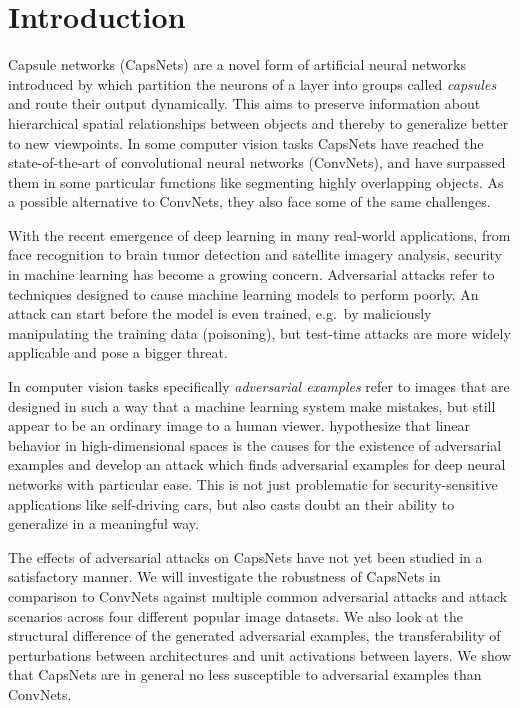 \section{Introduction}
\label{sec:introduction}

Capsule networks (CapsNets) are a novel form of artificial neural networks introduced by \citet{capsules,em} which partition the neurons of a layer into groups called \emph{capsules} and route their output dynamically.
This aims to preserve information about hierarchical spatial relationships between objects and thereby to generalize better to new viewpoints.
In some computer vision tasks CapsNets have reached the state-of-the-art of convolutional neural networks (ConvNets), and have surpassed them in some particular functions like segmenting highly overlapping objects.
As a possible alternative to ConvNets, they also face some of the same challenges.

With the recent emergence of deep learning in many real-world applications, from face recognition to brain tumor detection and satellite imagery analysis, security in machine learning has become a growing concern.
Adversarial attacks refer to techniques designed to cause machine learning models to perform poorly.
An attack can start before the model is even trained, e.g.\ by maliciously manipulating the training data (poisoning), but test-time attacks are more widely applicable and pose a bigger threat.

In computer vision tasks specifically \emph{adversarial examples} \citep{intriguing} refer to images  that are designed in such a way that a machine learning system make mistakes, but still appear to be an ordinary image to a human viewer.
\citet{fgsm} hypothesize that linear behavior in high-dimensional spaces is the causes for the existence of adversarial examples and develop an attack which finds adversarial examples for deep neural networks with particular ease.
This is not just problematic for security-sensitive applications like self-driving cars, but also casts doubt an their ability to generalize in a meaningful way.

The effects of adversarial attacks on CapsNets have not yet been studied in a satisfactory manner.
We will investigate the robustness of CapsNets in comparison to ConvNets against multiple common adversarial attacks and attack scenarios across four different popular image datasets.
We also look at the structural difference of the generated adversarial examples, the transferability of perturbations between architectures and unit activations between layers.
We show that CapsNets are in general no less susceptible to adversarial examples than ConvNets.


